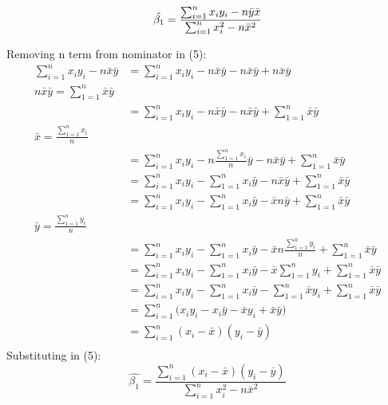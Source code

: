 \documentclass{article}
\begin{document}
\begin{equation}
\hat{\beta_1} =  \frac{\sum_{i=1}^{n}x_i y_i- n\bar{y}\bar{x}}{\sum_{i=1}^{n}x_i^2 - n\bar{x}^2} \\ \label{eq:5}
\end{equation}


Removing n term from nominator in (5):
\begin{align*}
\sum_{i=1}^{n}  x_i y_i - n\bar{x}\bar{y} & = \sum_{i=1}^{n}x_i y_i - n\bar{x}\bar{y} - n\bar{x}\bar{y} + n\bar{x}\bar{y} \\ %
n\bar{x}\bar{y} = \sum_{1=1}^{n}\bar{x}\bar{y} \\ %
& = \sum_{i=1}^{n}x_i y_i - n\bar{x}\bar{y} - n\bar{x}\bar{y} + \sum_{1=1}^{n}\bar{x}\bar{y} \\ %
\bar{x} = \frac{\sum_{1=1}^{n}x_i}{n} \\ %
& = \sum_{i=1}^{n}x_i y_i - n\frac{\sum_{1=1}^{n}x_i}{n}\bar{y} - n\bar{x}\bar{y} + \sum_{1=1}^{n}\bar{x}\bar{y} \\ %
& = \sum_{i=1}^{n}x_i y_i - \sum_{1=1}^{n}x_i\bar{y} - n\bar{x}\bar{y} + \sum_{1=1}^{n}\bar{x}\bar{y} \\ %
& = \sum_{i=1}^{n}x_i y_i - \sum_{1=1}^{n}x_i\bar{y} - \bar{x}n\bar{y} + \sum_{1=1}^{n}\bar{x}\bar{y} \\ %
 \bar{y} = \frac{\sum_{1=1}^{n}y_i}{n} \\  %
& = \sum_{i=1}^{n}x_i y_i - \sum_{1=1}^{n}x_i\bar{y} - \bar{x}n\frac{\sum_{1=1}^{n}y_i}{n} + \sum_{1=1}^{n}\bar{x}\bar{y}  \\ %
& = \sum_{i=1}^{n}x_i y_i - \sum_{1=1}^{n}x_i\bar{y} - \bar{x}\sum_{1=1}^{n}y_i + \sum_{1=1}^{n}\bar{x}\bar{y} \\ %
& = \sum_{i=1}^{n}x_i y_i - \sum_{1=1}^{n}x_i\bar{y} - \sum_{1=1}^{n}\bar{x}y_i + \sum_{1=1}^{n}\bar{x}\bar{y} \\ %
& = \sum_{i=1}^{n}\big(x_i y_i - x_i \bar{y} - \bar{x}y_i + \bar{x}\bar{y}\big) \\ %
& = \sum_{i=1}^{n}(x_i - \bar{x})(y_i - \bar{y}) \\
\end{align*}
Substituting in (5):
\begin{equation}
\hat{\beta_1}=  \frac{\sum_{i=1}^{n}(x_i - \bar{x})(y_i - \bar{y})}{\sum_{i=1}^{n}x_i^2 - n\bar{x}^2}  \label{eq:6}
\end{equation}
\end{document}
